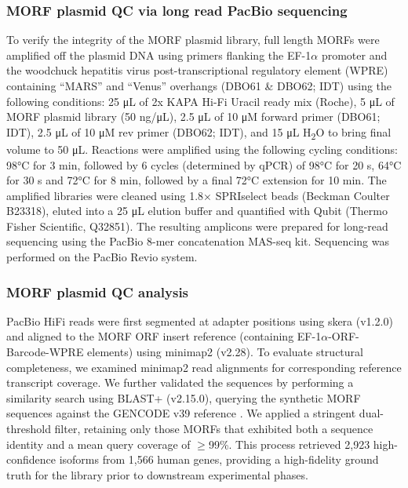 \subsubsection{MORF plasmid QC via long read PacBio sequencing}\label{morf-plasmid-qc-via-long-read-pacbio-sequencing}

To verify the integrity of the MORF plasmid library, full length MORFs were amplified off the plasmid DNA using primers flanking the EF-1$\alpha$ promoter and the woodchuck hepatitis virus post-transcriptional regulatory element (WPRE) containing ``MARS'' and ``Venus'' overhangs (DBO61 \& DBO62; IDT) using the following conditions: 25 μL of 2x KAPA Hi-Fi Uracil ready mix (Roche), 5 μL of MORF plasmid library (50 ng/μL), 2.5 μL of 10 μM forward primer (DBO61; IDT), 2.5 μL of 10 μM rev primer (DBO62; IDT), and 15 μL H\textsubscript{2}O to bring final volume to 50 μL. Reactions were amplified using the following cycling conditions: 98°C for 3 min, followed by 6 cycles (determined by qPCR) of 98°C for 20 s, 64°C for 30 s and 72°C for 8 min, followed by a final 72°C extension for 10 min. The amplified libraries were cleaned using 1.8× SPRIselect beads (Beckman Coulter B23318), eluted into a 25 μL elution buffer and quantified with Qubit (Thermo Fisher Scientific, Q32851). The resulting amplicons were prepared for long-read sequencing using the PacBio 8-mer concatenation MAS-seq kit. Sequencing was performed on the PacBio Revio system.

\subsubsection{MORF plasmid QC analysis}\label{morf-plasmid-qc-analysis}

PacBio HiFi reads were first segmented at adapter positions using skera (v1.2.0) and aligned to the MORF ORF insert reference (containing EF-1$\alpha$-ORF-Barcode-WPRE elements) using minimap2 (v2.28). To evaluate structural completeness, we examined minimap2 read alignments for corresponding reference transcript coverage. We further validated the sequences by performing a similarity search using BLAST+ (v2.15.0), querying the synthetic MORF sequences against the GENCODE v39 reference \citep{gencodend}. We applied a stringent dual-threshold filter, retaining only those MORFs that exhibited both a sequence identity and a mean query coverage of $\geq$99\%. This process retrieved 2,923 high-confidence isoforms from 1,566 human genes, providing a high-fidelity ground truth for the library prior to downstream experimental phases.

